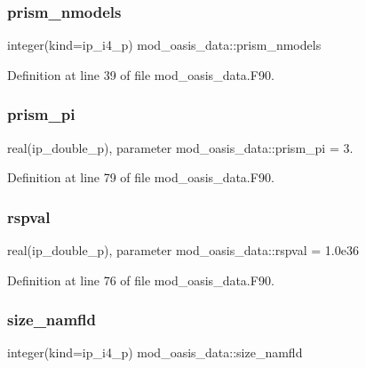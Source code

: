 \subsubsection{\texorpdfstring{prism\+\_\+nmodels}{prism\_nmodels}}
{\footnotesize\ttfamily integer(kind=ip\+\_\+i4\+\_\+p) mod\+\_\+oasis\+\_\+data\+::prism\+\_\+nmodels}



Definition at line 39 of file mod\+\_\+oasis\+\_\+data.\+F90.

\mbox{\label{namespacemod__oasis__data_ad5c84ea4b3063c2a3883b6d6571afeb0}} 
\subsubsection{\texorpdfstring{prism\+\_\+pi}{prism\_pi}}
{\footnotesize\ttfamily real(ip\+\_\+double\+\_\+p), parameter mod\+\_\+oasis\+\_\+data\+::prism\+\_\+pi = 3.}



Definition at line 79 of file mod\+\_\+oasis\+\_\+data.\+F90.

\mbox{\label{namespacemod__oasis__data_a3fea2837639caadabd693f405693edbb}} 
\subsubsection{\texorpdfstring{rspval}{rspval}}
{\footnotesize\ttfamily real(ip\+\_\+double\+\_\+p), parameter mod\+\_\+oasis\+\_\+data\+::rspval = 1.\+0e36}



Definition at line 76 of file mod\+\_\+oasis\+\_\+data.\+F90.

\mbox{\label{namespacemod__oasis__data_aa8588b3be582de7f61aa318d45854483}} 
\subsubsection{\texorpdfstring{size\+\_\+namfld}{size\_namfld}}
{\footnotesize\ttfamily integer(kind=ip\+\_\+i4\+\_\+p) mod\+\_\+oasis\+\_\+data\+::size\+\_\+namfld}



